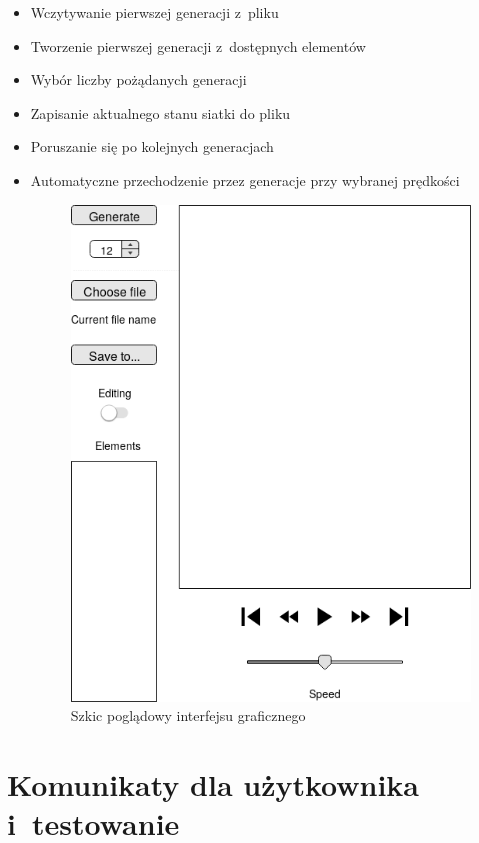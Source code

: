 \documentclass[a4paper,11pt]{article}
\begin{document}
			\begin{itemize}
			  \item Wczytywanie pierwszej generacji z~pliku
			  \item Tworzenie pierwszej generacji z~dostępnych elementów
			  \item Wybór liczby pożądanych generacji
			  \item Zapisanie aktualnego stanu siatki do pliku
			  \item Poruszanie się po kolejnych generacjach
			  \item Automatyczne przechodzenie przez generacje przy wybranej prędkości
			  \begin{figure}[h]
			    \begin{center}
			      \includegraphics[scale=0.5]{GUI.png}
			      \caption{Szkic poglądowy interfejsu graficznego}
			      \label{fig:}
			    \end{center}
			  \end{figure}
			\end{itemize}
		\newpage
		\section{Komunikaty dla użytkownika i~testowanie}
\end{document}
